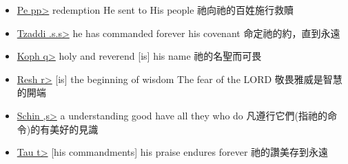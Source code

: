 \begin{itemize}
\item \underline{Pe \<pp>}  redemption He sent to His people 祂向祂的百姓施行救贖 
\item \underline{Tzaddi \<.s.s>} he has commanded forever his covenant 命定祂的約，直到永遠 
\item \underline{Koph \<q>} holy and reverend [is] his name 祂的名聖而可畏\\
\item \underline{Resh  \<r>}  [is] the beginning of wisdom The fear of the LORD 敬畏雅威是智慧的開端 
\item \underline{Schin \<,s>} a understanding good have all they who do 凡遵行它們(指祂的命令)的有美好的見識 
\item \underline{Tau \<t>} [his commandments] his praise endures forever 祂的讚美存到永遠 
\end{itemize}




